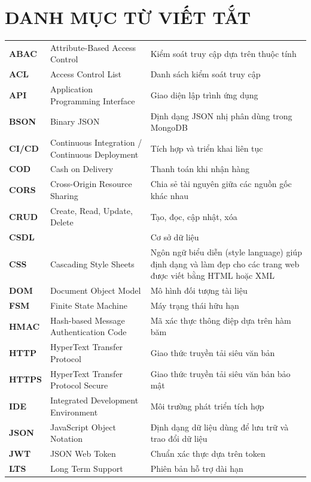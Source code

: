 \documentclass[../DoAn.tex]{subfiles}
\begin{document}
\chapter*{DANH MỤC TỪ VIẾT TẮT}
\begin{longtable}{l p{6cm} p{7cm}}
	\hline
  \textbf{ABAC} & Attribute-Based Access Control & Kiểm soát truy cập dựa trên thuộc tính\\
  \textbf{ACL} & Access Control List & Danh sách kiểm soát truy cập\\
  \textbf{API} & Application Programming Interface & Giao diện lập trình ứng dụng\\
  \textbf{BSON} & Binary JSON & Định dạng JSON nhị phân dùng trong MongoDB\\
  \textbf{CI/CD} & Continuous Integration / Continuous Deployment & Tích hợp và triển khai liên tục\\
  \textbf{COD} & Cash on Delivery & Thanh toán khi nhận hàng\\
  \textbf{CORS} & Cross-Origin Resource Sharing & Chia sẻ tài nguyên giữa các nguồn gốc khác nhau\\
  \textbf{CRUD} & Create, Read, Update, Delete & Tạo, đọc, cập nhật, xóa\\
  \textbf{CSDL} & & Cơ sở dữ liệu\\
  \textbf{CSS} & Cascading Style Sheets & Ngôn ngữ biểu diễn (style language) giúp định dạng và làm đẹp cho các trang web được viết bằng HTML hoặc XML\\
  \textbf{DOM} & Document Object Model & Mô hình đối tượng tài liệu\\
  \textbf{FSM} & Finite State Machine & Máy trạng thái hữu hạn\\
  \textbf{HMAC} & Hash-based Message Authentication Code & Mã xác thực thông điệp dựa trên hàm băm\\
  \textbf{HTTP} & HyperText Transfer Protocol & Giao thức truyền tải siêu văn bản\\
  \textbf{HTTPS} & HyperText Transfer Protocol Secure & Giao thức truyền tải siêu văn bản bảo mật\\
  \textbf{IDE} & Integrated Development Environment & Môi trường phát triển tích hợp\\
  \textbf{JSON} & JavaScript Object Notation & Định dạng dữ liệu dùng để lưu trữ và trao đổi dữ liệu\\
  \textbf{JWT} & JSON Web Token & Chuẩn xác thực dựa trên token\\
  \textbf{LTS} & Long Term Support & Phiên bản hỗ trợ dài hạn\\

\end{longtable}
\end{document}
